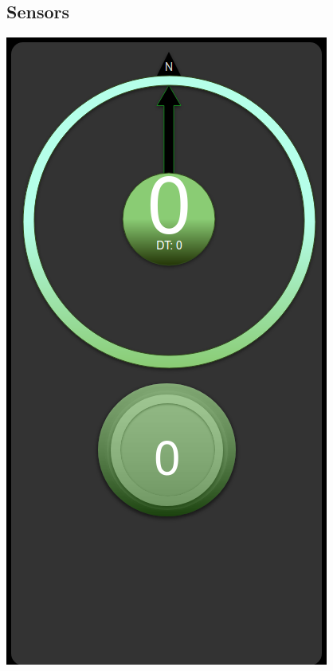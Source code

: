 \documentclass[12pt]{article}
\begin{document}
\subsection{Sensors}
\noindent
\begin{minipage}[t]{0.4\textwidth}
    \vspace{0pt} 
	\includegraphics[width=\linewidth]{Images/sensors_section.png}
	\label{fig:sensor section}
\end{minipage}%
\end{document}
